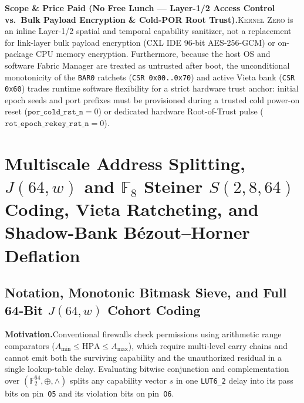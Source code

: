 \documentclass[11pt,letterpaper]{article}
\theoremstyle{spectralthm}
\begin{document}
\noindent\textbf{Scope \& Price Paid (No Free Lunch --- Layer-1/2 Access Control vs.\ Bulk Payload Encryption \& Cold-POR Root Trust).}\;\textsc{Kernel Zero} is an inline Layer-1/2 spatial and temporal capability sanitizer, not a replacement for link-layer bulk payload encryption (CXL IDE 96-bit AES-256-GCM) or on-package CPU memory encryption. Furthermore, because the host OS and software Fabric Manager are treated as untrusted after boot, the unconditional monotonicity of the \texttt{BAR0} ratchets (\texttt{CSR 0x00..0x70}) and active Vieta bank (\texttt{CSR 0x60}) trades runtime software flexibility for a strict hardware trust anchor: initial epoch seeds and port prefixes must be provisioned during a trusted cold power-on reset ($\texttt{por\_cold\_rst\_n} = 0$) or dedicated hardware Root-of-Trust pulse ($\texttt{rot\_epoch\_rekey\_rst\_n} = 0$).

\section{Multiscale Address Splitting, \texorpdfstring{$J(64,w)$}{J(64,w)} and \texorpdfstring{$\mathbb{F}_8$}{F8} Steiner \texorpdfstring{$S(2,8,64)$}{S(2,8,64)} Coding, Vieta Ratcheting, and Shadow-Bank B\'{e}zout--Horner Deflation}
\label{sec:multiscale}

\subsection{Notation, Monotonic Bitmask Sieve, and Full 64-Bit \texorpdfstring{$J(64,w)$}{J(64,w)} Cohort Coding}
\label{sec:sieve_prelim}
\noindent\textbf{Motivation.}\;Conventional firewalls check permissions using arithmetic range comparators ($A_{\min} \le \mathrm{HPA} \le A_{\max}$), which require multi-level carry chains and cannot emit both the surviving capability and the unauthorized residual in a single lookup-table delay. Evaluating bitwise conjunction and complementation over $(\mathbb{F}_2^{64}, \oplus, \wedge)$ splits any capability vector $s$ in one \mbox{\texttt{LUT6\_2}} delay into its pass bits on pin~\texttt{O5} and its violation bits on pin~\texttt{O6}.\par\smallskip
\end{document}

